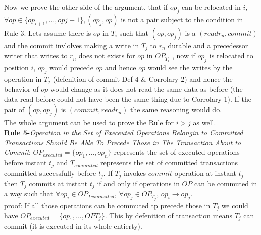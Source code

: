 \documentclass[a4paper, 11pt]{article}
\begin{document}
Now we prove the other side of the argument, that if $op_j$ can be relocated in $i$, $\forall op \in \{op_{i+1}, ..., op{j-1}\}, (op_j, op)$ is not a pair subject to the condition in Rule 3. Lets assume there is $op$ in $T_i$ such that $(op, op_{j})$ is a $({read r_n}, {commit})$  and the commit invlolves making a write in $T_j$ to $r_n$ durable and a precedessor writer that writes to $r_n$ does not exists for $op$ in $OP_{T_i}$ , now if $op_j$ is relocated to position $i$, $op_j$ would precede $op$ and hence $op$ would see the writes by the operation in $T_j$ (defenition of commit Def 4 \& Corrolary  2) and hence the behavior of $op$ would change as it does not read the same data as before (the data read before could not have been the same thing due to Corrolary 1). If the pair of $(op, op_j)$ is $({commit}, {read r_n})$ the same reasoning would do.\\   

The whole argument can be used to prove the Rule for $i > j$ as well.\\

\textbf{Rule 5-}\emph{Operation in the Set of Execeuted Operations Belongin to Committed Transactions Should Be Able To Precede Those in The Transaction About to Commit}: $OP_{executed} = \{op_1,..., op_n\}$ represents the set of executed operations before instant $t_j$ and $T_{committed}$ represents the set of committed transactions committed successfully before $t_j$. If $T_j$ invokes ${commit}$ operation at instant $t_j$ - then $T_j$ commits at instant $t_j$ if and only if operations in $OP$ can be commuted in a way such that $\forall op_i \in OP_{T{committed}}$, $\forall op_j \in OP_{T_j}$, $op_i \rightarrow op_j$.\\


proof: If all those operations can be commuted tp precede those in $T_j$ we could have $OP_{executed} = \{op_1,...,OP{T_j}\}$. This by defenition of transaction means $T_j$ can commit (it is executed in its whole entierty).\\
\end{document}
